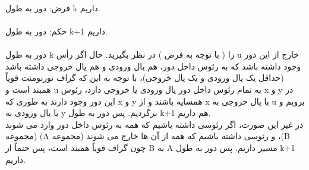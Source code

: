 \documentclass{ut}
\begin{document}
\begin{enumerate}
    \\
    \\
    \\
    فرض: دور به طول k داریم.\\\\
    حکم: دور به طول k+1 داریم. \\\\
    دور به طول k را ( با توجه به فرض ) در نظر بگیرید. حال اگر رأس u خارج از این دور وجود داشته باشد که به رئوس داخل دور، هم یال ورودی و هم یال خروجی داشته باشد (حداقل یک یال ورودی و یک یال خروجی)، با توجه به این که گراف تورنومنت قویاً همبند است و u به تمام رئوس داخل دور یال ورودی یا خروجی دارد، رئوس x و y در این دور وجود دارند به طوری که x و y همسایه باشند و از x با یال خروجی به u برویم و با یال ورودی به y برگردیم. پس دور به طول k+1 هم داریم.\\
    در غیر این صورت، اگر رئوسی داشته باشیم که همه به رئوس داخل دور وارد می شوند (مجموعه (A و رئوسی داشته باشیم که همه از آن ها خارج می شوند (مجموعه ،(B چون گراف قویاً همبند است، پس حتماً از B به  A مسیر داریم. پس دور به طول k+1 داریم.\\
    \\
    \\
\end{enumerate}
\end{document}
